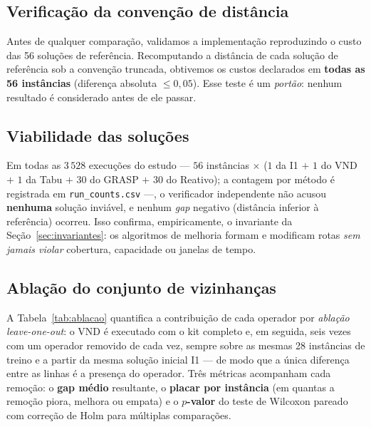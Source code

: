 \documentclass[12pt, a4paper]{article}
\begin{document}
\subsection{Verificação da convenção de distância}\label{sec:verificacao}
Antes de qualquer comparação, validamos a implementação reproduzindo o custo das 56 soluções de referência. Recomputando a distância de cada solução de referência sob a convenção truncada, obtivemos os custos declarados em \textbf{todas as 56 instâncias} (diferença absoluta $\le 0{,}05$). Esse teste é um \emph{portão}: nenhum resultado é considerado antes de ele passar.

\subsection{Viabilidade das soluções}\label{sec:viabilidade}
Em todas as $3\,528$ execuções do estudo --- $56$ instâncias $\times$ ($1$ da I1 $+$ $1$ do VND $+$ $1$ da Tabu $+$ $30$ do GRASP $+$ $30$ do Reativo); a contagem por método é registrada em \texttt{run\_counts.csv} ---, o verificador independente não acusou \textbf{nenhuma} solução inviável, e nenhum \emph{gap} negativo (distância inferior à referência) ocorreu. Isso confirma, empiricamente, o invariante da Seção~\ref{sec:invariantes}: os algoritmos de melhoria formam e modificam rotas \emph{sem jamais violar} cobertura, capacidade ou janelas de tempo.

\subsection{Ablação do conjunto de vizinhanças}\label{sec:ablacao}
A Tabela~\ref{tab:ablacao} quantifica a contribuição de cada operador por \emph{ablação leave-one-out}: o VND é executado com o kit completo e, em seguida, seis vezes com um operador removido de cada vez, sempre sobre as mesmas 28 instâncias de treino e a partir da mesma solução inicial I1 --- de modo que a única diferença entre as linhas é a presença do operador. Três métricas acompanham cada remoção: o \textbf{gap médio} resultante, o \textbf{placar por instância} (em quantas a remoção piora, melhora ou empata) e o \textbf{$p$-valor} do teste de Wilcoxon pareado com correção de Holm para múltiplas comparações.


\end{document}
